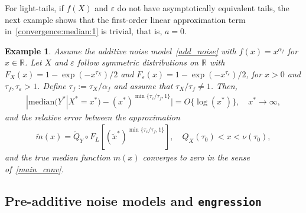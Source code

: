\documentclass{statsoc}
\newtheorem{example}{Example}
\theoremstyle{break}
\newcommand{\eps}{\varepsilon}
\newcommand{\tauzero}{\tau_0}
\def\M{\text{median}}
\begin{document}
For light-tails, if $f(X)$ and $\varepsilon$ do not have asymptotically equivalent tails, the next example shows that the first-order linear approximation term in~\eqref{convergence:median:1} is trivial, that is, $a=0$.  

\begin{example}\label{example:beta:not:zero}\label{lem:weibull:light:tails}
Assume the additive noise model~\eqref{add_noise} with $f(x) = x^{\alpha_f}$ for $x \in \mathbb R$. Let $X$ and $\varepsilon$ follow symmetric distributions on $\mathbb R$ with $F_X(x) = 1-\exp(-x^{\tau_X})/2$  and $F_\varepsilon(x) = 1- \exp(- x^{\tau_\eps})/2$, for $x > 0$ and $\tau_f, \tau_\eps > 1$. 
 Define $\tau_f := \tau_X/\alpha_f$ and assume that $\tau_X/\tau_f \not = 1$. Then, 
\begin{align}\label{eq:median:result:2}
		|\M(Y^* | X^* = x^*) - (x^*)^{\min\{\tau_\eps/\tau_f,1\} }| = O\{\log(x^*)\}, \quad x^* \to\infty,
	\end{align} 
	and the relative error between the approximation 
	\begin{align*} 
	\tilde m(x) =  
	\tilde Q_Y \circ F_L[(\tilde x^*)^{\min\{\tau_\eps/\tau_f,1\}}], \quad Q_X(\tauzero) <  x < \nu(\tauzero),
	\end{align*}
	and the true median function $m(x)$ converges to zero in the sense of~\eqref{main_conv}.

\end{example}



\subsection{Pre-additive noise models and \texttt{engression}}\label{engression}
\end{document}
